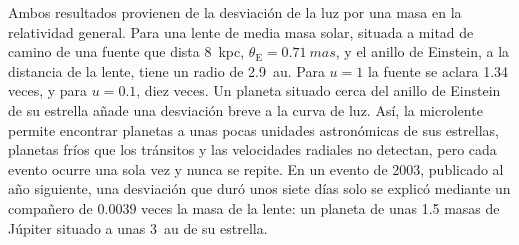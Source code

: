 Ambos resultados provienen de la desviación de la luz por una masa en
la relatividad general. Para una lente de media masa solar, situada a mitad de camino
de una fuente que dista \qty{8}{kpc}, $\theta_\mathrm E = \qty{0.71}{mas}$, y el anillo de Einstein,
a la distancia de la lente, tiene un radio de \qty{2.9}{au}. Para
$u = 1$ la fuente se aclara 1.34 veces, y para $u = 0.1$, diez veces. Un
planeta situado cerca del anillo de Einstein de su estrella añade una desviación breve
a la curva de luz. Así, la microlente permite encontrar planetas a unas pocas unidades
astronómicas de sus estrellas, planetas fríos que los tránsitos y las velocidades radiales no detectan,
pero cada evento ocurre una sola vez y nunca se repite. En un evento de 2003,
publicado al año siguiente, una desviación que duró unos siete días solo se explicó
mediante un compañero de $\num{0.0039}$ veces la masa de la lente: un planeta de unas
1.5 masas de Júpiter situado a unas \qty{3}{au}
de su estrella.

